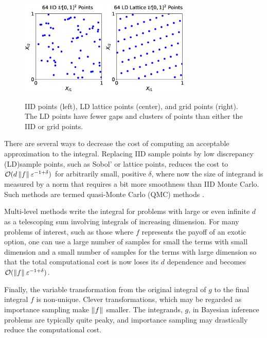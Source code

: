\begin{figure}
	\centering
	\includegraphics[height = 4.5cm]{iid_scatter.eps} \quad
	\includegraphics[height = 4.5cm]{lattice_scatter.eps}
	\caption{IID points (left), LD lattice points (center), and grid points (right).  The LD points have fewer gaps and clusters of points than either the IID or grid points. \label{fig:iid_vs_ld}}

\end{figure}
There are several ways to decrease the cost of computing an acceptable approximation to the integral.  Replacing IID sample points by low discrepancy (LD)sample points, such as Sobol' or lattice points, reduces the cost to $\mathcal{O}(d\left \lVert f \right \rVert_{{}}\varepsilon^{-1+\delta})$ for arbitrarily small, positive $\delta$, where now the size of integrand is measured by a norm that requires a bit more smoothness than IID Monte Carlo.  Such methods are termed quasi-Monte Carlo (QMC) methods \cite{DicEtal14a}. 

Multi-level methods write the integral for problems with large or even infinite $d$ as a telescoping sum involving integrals of increasing dimension.  
For many problems of interest, such as those where $f$ represents the payoff of an exotic option, one can use a large number of samples for small the terms with small dimension and a small number of samples for the terms with large dimension so that the total computational cost is now loses its $d$ dependence and becomes $\mathcal{O}(\left \lVert f \right \rVert_{{}}\varepsilon^{-1+\delta})$.

Finally, the variable transformation from the original integral of $g$ to the final integral $f$ is non-unique.  Clever transformations, which may be regarded as importance sampling make $\left \lVert f \right \rVert_{{}}$ smaller.  The integrands, $g$, in Bayesian inference problems are typically quite peaky, and importance sampling may drastically reduce the computational cost.

